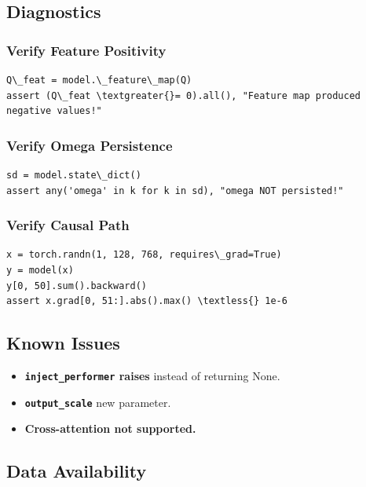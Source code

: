 \subsection{Diagnostics}

\subsubsection{Verify Feature Positivity}

\begin{lstlisting}
Q\_feat = model.\_feature\_map(Q)
assert (Q\_feat \textgreater{}= 0).all(), "Feature map produced negative values!"
\end{lstlisting}

\subsubsection{Verify Omega Persistence}

\begin{lstlisting}
sd = model.state\_dict()
assert any('omega' in k for k in sd), "omega NOT persisted!"
\end{lstlisting}

\subsubsection{Verify Causal Path}

\begin{lstlisting}
x = torch.randn(1, 128, 768, requires\_grad=True)
y = model(x)
y[0, 50].sum().backward()
assert x.grad[0, 51:].abs().max() \textless{} 1e-6
\end{lstlisting}

\subsection{Known Issues}

\begin{itemize}
\item \textbf{\texttt{inject\_performer} raises} instead of returning None.
\item \textbf{\texttt{output\_scale}} new parameter.
\item \textbf{Cross-attention not supported.}

\end{itemize}
\subsection{Data Availability}

